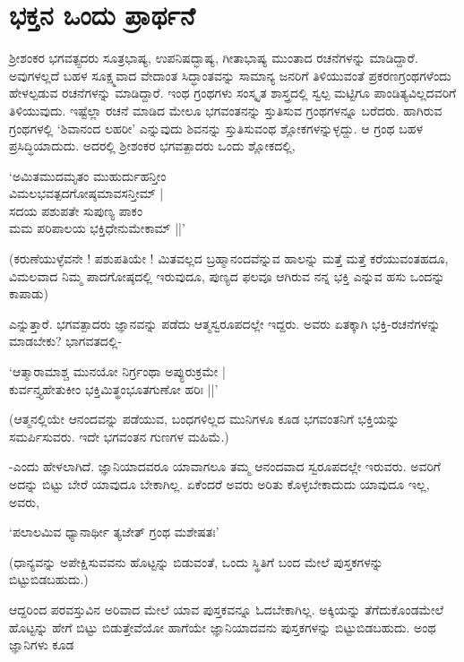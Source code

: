 \chapter{ಭಕ್ತನ ಒಂದು ಪ್ರಾರ್ಥನೆ}\label{chap11}

ಶ್ರೀಶಂಕರ ಭಗವತ್ಪ್ಪದರು ಸೂತ್ರಭಾಷ್ಯ, ಉಪನಿಷದ್ಭಾಷ್ಯ, ಗೀತಾಭಾಷ್ಯ ಮುಂತಾದ ರಚನೆಗಳನ್ನು ಮಾಡಿದ್ದಾರೆ. ಅವುಗಳಲ್ಲದೆ ಬಹಳ ಸೂಕ್ಷ್ಮವಾದ ವೇದಾಂತ ಸಿದ್ಧಾಂತವನ್ನು ಸಾಮಾನ್ಯ ಜನರಿಗೆ ತಿಳಿಯುವಂತೆ ಪ್ರಕರಣಗ್ರಂಥಗಳೆಂದು ಹೇಳಲ್ಪಡುವ ರಚನೆಗಳನ್ನು ಮಾಡಿದ್ದಾರೆ. ಇಂಥ ಗ್ರಂಥಗಳು ಸಂಸ್ಕೃತ ಶಾಸ್ತ್ರದಲ್ಲಿ ಸ್ವಲ್ಪ ಮಟ್ಟಿಗೂ ಪಾಂಡಿತ್ಯವಿಲ್ಲದವರಿಗೆ ತಿಳಿಯುವುದು. ಇಷ್ಟೆಲ್ಲಾ ರಚನೆ ಮಾಡಿದ ಮೇಲೂ ಭಗವಂತನನ್ನು ಸ್ತುತಿಸುವ ಗ್ರಂಥಗಳನ್ನೂ ಬರೆದರು. ಹಾಗಿರುವ ಗ್ರಂಥಗಳಲ್ಲಿ `ಶಿವಾನಂದ ಲಹರೀ' ಎನ್ನುವುದು ಶಿವನನ್ನು ಸ್ತುತಿಸುವಂಥ ಶ್ಲೋಕಗಳನ್ನುಳ್ಳದ್ದು. ಆ ಗ್ರಂಥ ಬಹಳ ಪ್ರಸಿದ್ಧಿಯಾದುದು. ಅದರಲ್ಲಿ ಶ್ರೀಶಂಕರ ಭಗವತ್ಪಾದರು ಒಂದು ಶ್ಲೋಕದಲ್ಲಿ,

\begin{shloka}
`ಅಮಿತಮುದಮೃತಂ ಮುಹುರ್ದುಹನ್ತೀಂ\\
ವಿಮಲಭವತ್ಪದಗೋಷ್ಠಮಾವಸನ್ತೀಮ್ |\\
ಸದಯ ಪಶುಪತೇ ಸುಪುಣ್ಯ ಪಾಕಂ\\
ಮಮ ಪರಿಪಾಲಯ ಭಕ್ತಿಧೇನುಮೇಕಾಮ್ ||'
\end{shloka}

(ಕರುಣೆಯುಳ್ಳೆವನೇ ! ಪಶುಪತಿಯೇ ! ಮಿತವಲ್ಲದ ಬ್ರಹ್ಮಾನಂದವೆನ್ನುವ ಹಾಲನ್ನು ಮತ್ತೆ ಮತ್ತೆ ಕರೆಯುವಂತಹದೂ, ವಿಮಲವಾದ ನಿಮ್ಮ ಪಾದಗೋಷ್ಠದಲ್ಲಿ ಇರುವುದೂ, ಪುಣ್ಯದ ಫಲವೂ ಆಗಿರುವ ನನ್ನ ಭಕ್ತಿ ಎನ್ನುವ ಹಸು ಒಂದನ್ನು ಕಾಪಾಡು)

ಎನ್ನುತ್ತಾರೆ. ಭಗವತ್ಪಾದರು ಜ್ಞಾನವನ್ನು ಪಡೆದು ಆತ್ಮಸ್ವರೂಪದಲ್ಲೇ ಇದ್ದರು. ಅವರು ಏತಕ್ಕಾಗಿ ಭಕ್ತಿ-ರಚನೆಗಳನ್ನು ಮಾಡಬೇಕು? ಭಾಗವತದಲ್ಲಿ-

\begin{shloka}
`ಆತ್ಮಾರಾಮಾಶ್ಚ ಮುನಯೋ ನಿರ್ಗ್ರಂಥಾ ಅಪ್ಯುರುಕ್ರಮೇ |\\
ಕುರ್ವನ್ತ್ಯಹೇತುಕೀಂ ಭಕ್ತಿಮಿತ್ಥಂಭೂತಗುಣೋ ಹರಿಃ ||'
\end{shloka}

(ಆತ್ಮನಲ್ಲಿಯೇ ಆನಂದವನ್ನು ಪಡೆಯುವ, ಬಂಧಗಳಿಲ್ಲದ ಮುನಿಗಳೂ ಕೂಡ ಭಗವಂತನಿಗೆ ಭಕ್ತಿಯನ್ನು ಸಮರ್ಪಿಸುವರು. ಇದೇ ಭಗವಂತನ ಗುಣಗಳ ಮಹಿಮೆ.)

-ಎಂದು ಹೇಳಲಾಗಿದೆ. ಜ್ಞಾನಿಯಾದವರೂ ಯಾವಾಗಲೂ ತಮ್ಮ ಆನಂದವಾದ ಸ್ವರೂಪದಲ್ಲೇ ಇರುವರು. ಅವರಿಗೆ ಅದನ್ನು ಬಿಟ್ಟು ಬೇರೆ ಯಾವುದೂ ಬೇಕಾಗಿಲ್ಲ. ಏಕೆಂದರೆ ಅವರು ಅರಿತು ಕೊಳ್ಳಬೇಕಾದುದು ಯಾವುದೂ ಇಲ್ಲ, ಅವರು,

\begin{shloka}
`ಪಲಾಲಮಿವ ಧ್ಯಾನಾರ್ಥೀ ತ್ಯಜೇತ್ ಗ್ರಂಥ ಮಶೇಷತಃ'
\end{shloka}

(ಧಾನ್ಯವನ್ನು ಅಪೇಕ್ಷಿಸುವವನು ಹೊಟ್ಟನ್ನು ಬಿಡುವಂತೆ, ಒಂದು ಸ್ಥಿತಿಗೆ ಬಂದ ಮೇಲೆ ಪುಸ್ತಕಗಳನ್ನು ಬಿಟ್ಟುಬಿಡಬಹುದು.)

ಆದ್ದರಿಂದ ಪರವಸ್ತುವಿನ ಅರಿವಾದ ಮೇಲೆ ಯಾವ ಪುಸ್ತಕವನ್ನೂ ಓದಬೇಕಾಗಿಲ್ಲ. ಅಕ್ಕಿಯನ್ನು ತೆಗೆದುಕೊಂಡಮೇಲೆ ಹೊಟ್ಟನ್ನು ಹೇಗೆ ಬಿಟ್ಟು ಬಿಡುತ್ತೇವೆಯೋ ಹಾಗೆಯೇ ಜ್ಞಾನಿಯಾದವನು ಪುಸ್ತಕಗಳನ್ನು ಬಿಟ್ಟುಬಿಡಬಹುದು. ಅಂಥ ಜ್ಞಾನಿಗಳು ಕೂಡ

